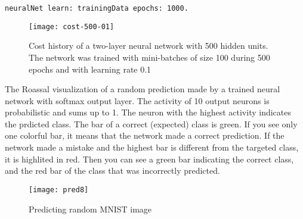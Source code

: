\begin{lstlisting}
neuralNet learn: trainingData epochs: 1000.
\end{lstlisting}

\begin{figure}[H]
  \centering
  \texttt{[image: cost-500-01]}
  \caption{Cost history of a two-layer neural network with 500 hidden units. The network was trained with mini-batches of size 100 during 500 epochs and with learning rate 0.1 }
  \label{fig:cost-500-01}
\end{figure}

The Roassal\cite{Bergel} visualization of a random prediction made by a trained neural network with softmax output layer. The activity of 10 output neurons is probabilistic and sums up to 1. The neuron with the highest activity indicates the prdicted class. The bar of a correct (expected) class is green. If you see only one colorful bar, it means that the network made a correct prediction. If the network made a mistake and the highest bar is different from the targeted class, it is highlited in red. Then you can see a green bar indicating the correct class, and the red bar of the class that was incorrectly predicted.

\begin{figure}[H]
  \centering
  \texttt{[image: pred8]}
  \caption{Predicting random MNIST image}
  \label{fig:pred8}
\end{figure}

